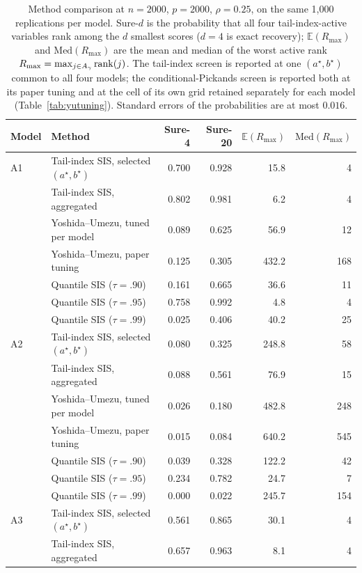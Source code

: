 \begin{table}[t]
\centering
\caption{Method comparison at $n=2000$, $p=2000$, $\rho=0.25$, on the same 1{,}000 replications per model. Sure-$d$ is the probability that all four tail-index-active variables rank among the $d$ smallest scores ($d=4$ is exact recovery); $\mathbb{E}(R_{\max})$ and $\mathrm{Med}(R_{\max})$ are the mean and median of the worst active rank $R_{\max}=\max_{j\in A_\gamma}\mathrm{rank}(j)$. The tail-index screen is reported at one $(a^\star,b^\star)$ common to all four models; the conditional-Pickands screen is reported both at its paper tuning and at the cell of its own grid retained separately for each model (Table~\ref{tab:yutuning}). Standard errors of the probabilities are at most $0.016$.}
\label{tab:cmp2000}
\begin{tabular}{llrrrr}
\toprule
Model & Method & Sure-4 & Sure-20 & $\mathbb{E}(R_{\max})$ & $\mathrm{Med}(R_{\max})$\\
\midrule
A1 & Tail-index SIS, selected $(a^\star,b^\star)$ & 0.700 & 0.928 & 15.8 & 4\\
 & Tail-index SIS, aggregated & 0.802 & 0.981 & 6.2 & 4\\
 & Yoshida--Umezu, tuned per model & 0.089 & 0.625 & 56.9 & 12\\
 & Yoshida--Umezu, paper tuning & 0.125 & 0.305 & 432.2 & 168\\
 & Quantile SIS ($\tau=.90$) & 0.161 & 0.665 & 36.6 & 11\\
 & Quantile SIS ($\tau=.95$) & 0.758 & 0.992 & 4.8 & 4\\
 & Quantile SIS ($\tau=.99$) & 0.025 & 0.406 & 40.2 & 25\\
\addlinespace
A2 & Tail-index SIS, selected $(a^\star,b^\star)$ & 0.080 & 0.325 & 248.8 & 58\\
 & Tail-index SIS, aggregated & 0.088 & 0.561 & 76.9 & 15\\
 & Yoshida--Umezu, tuned per model & 0.026 & 0.180 & 482.8 & 248\\
 & Yoshida--Umezu, paper tuning & 0.015 & 0.084 & 640.2 & 545\\
 & Quantile SIS ($\tau=.90$) & 0.039 & 0.328 & 122.2 & 42\\
 & Quantile SIS ($\tau=.95$) & 0.234 & 0.782 & 24.7 & 7\\
 & Quantile SIS ($\tau=.99$) & 0.000 & 0.022 & 245.7 & 154\\
\addlinespace
A3 & Tail-index SIS, selected $(a^\star,b^\star)$ & 0.561 & 0.865 & 30.1 & 4\\
 & Tail-index SIS, aggregated & 0.657 & 0.963 & 8.1 & 4\\

\end{tabular}
\end{table}

